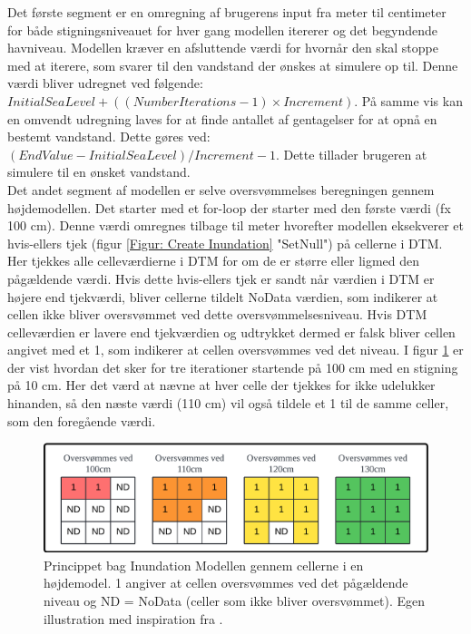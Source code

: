 Det første segment er en omregning af brugerens input fra meter til centimeter for både stigningsniveauet for hver gang modellen itererer og det begyndende havniveau. Modellen kræver en afsluttende værdi for hvornår den skal stoppe med at iterere, som svarer til den vandstand der ønskes at simulere op til. Denne værdi bliver udregnet ved følgende: \\$InitialSeaLevel + ((NumberIterations - 1)\times Increment)$. På samme vis kan en omvendt udregning laves for at finde antallet af gentagelser for at opnå en bestemt vandstand. Dette gøres ved: $(EndValue - InitialSeaLevel) / Increment - 1$. Dette tillader brugeren at simulere til en ønsket vandstand.\\

Det andet segment af modellen er selve oversvømmelses beregningen gennem højdemodellen. Det starter med et for-loop der starter med den første værdi (fx 100 cm). Denne værdi omregnes tilbage til meter hvorefter modellen eksekverer et hvis-ellers tjek (figur \ref{Figur: Create Inundation} "SetNull") på cellerne i DTM. Her tjekkes alle celleværdierne i DTM for om de er større eller ligmed den pågældende værdi. Hvis dette hvis-ellers tjek er sandt når værdien i DTM er højere end tjekværdi, bliver cellerne tildelt NoData værdien, som indikerer at cellen ikke bliver oversvømmet ved dette oversvømmelsesniveau. Hvis DTM celleværdien er lavere end tjekværdien og udtrykket dermed er falsk bliver cellen angivet med et 1, som indikerer at cellen oversvømmes ved det niveau. I figur \ref{Figur: Celler Inundated} er der vist hvordan det sker for tre iterationer startende på 100 cm med en stigning på 10 cm. Her det værd at nævne at hver celle der tjekkes for ikke udelukker hinanden, så den næste værdi (110 cm) vil også tildele et 1 til de samme celler, som den foregående værdi.       
\begin{figure}[H]
    \centering
    \includegraphics[width=0.7\linewidth]{images/teori/celler_inundated.png}
    \caption{Princippet bag Inundation Modellen gennem cellerne i en højdemodel. 1 angiver at cellen oversvømmes ved det pågældende niveau og ND = NoData (celler som ikke bliver oversvømmet). Egen illustration med inspiration fra \cite{balstrom_kirby_inundation}.}
    \label{Figur: Celler Inundated}
\end{figure}
